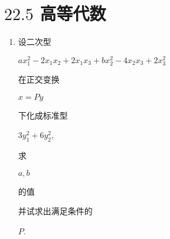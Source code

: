 \documentclass[10pt]{article}
\begin{document}
\section{$22.5$ 高等代数}
\begin{enumerate}
  \item \begin{CJK}{UTF8}{mj}设二次型\end{CJK} $a x_{1}^{2}-2 x_{1} x_{2}+2 x_{1} x_{3}+b x_{2}^{2}-4 x_{2} x_{3}+2 x_{3}^{2}$ \begin{CJK}{UTF8}{mj}在正交变换\end{CJK} $x=P y$ \begin{CJK}{UTF8}{mj}下化成标准型\end{CJK} $3 y_{1}^{2}+6 y_{2}^{2}$, \begin{CJK}{UTF8}{mj}求\end{CJK} $a, b$ \begin{CJK}{UTF8}{mj}的值\end{CJK} \begin{CJK}{UTF8}{mj}并试求出满足条件的\end{CJK} $P$.


\end{enumerate}
\end{document}
